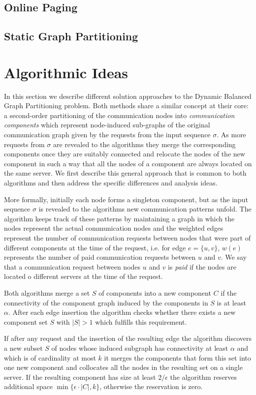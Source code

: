 \documentclass[a4paper,xcolor=dvipsnames, tikz, 12pt]{article}
\theoremstyle{definition}
\begin{document}
	\subsection{Online Paging}
	
	\subsection{Static Graph Partitioning}
	
	\section{Algorithmic Ideas}
	In this section we describe different solution approaches to the Dynamic Balanced Graph Partitioning problem. Both methods share a similar concept at their core: a second-order partitioning of the communication nodes into \textit{communication components} which represent node-induced sub-graphs of the original communication graph given by the requests from the input sequence $\sigma$. As more requests from $\sigma$ are revealed to the algorithms they merge the corresponding components once they are suitably connected and relocate the nodes of the new component in such a way that all the nodes of a component are always located on the same server.
	We first describe this general approach that is common to both algorithms and then address the specific differences and analysis ideas.
	
	More formally, initially each node forms a singleton component, but as the input sequence $\sigma$ is revealed to the algorithms new communication patterns unfold. The algorithm keeps track of these patterns by maintaining a graph in which the nodes represent the actual communication nodes and the weighted edges represent the number of communication requests between nodes that were part of different components at the time of the request, i.e. for edge $e=\{u,v\}$, $w(e)$ represents the number of paid communication requests between $u$ and $v$. We say that a communication request between nodes $u$ and $v$ is \textit{paid} if the nodes are located o different servers at the time of the request.
	
	Both algorithms merge a set $S$ of components into a new component $C$ if the connectivity of the component graph induced by the components in $S$ is at least $\alpha$. After each edge insertion the algorithm checks whether there exists a new component set $S$ with $|S|>1$ which fulfills this requirement.
	
	If after any request and the insertion of the resulting edge the algorithm discovers a new subset $S$ of nodes whose induced subgraph has connectivity at least $\alpha$ and which is of cardinality at most $k$ it merges the components that form this set into one new component and collocates all the nodes in the resulting set on a single server. If the resulting component has size at least $2/\epsilon$ the algorithm reserves additional space $\min\{\epsilon\cdot|C|,k\}$, otherwise the reservation is zero.
	
\end{document}
